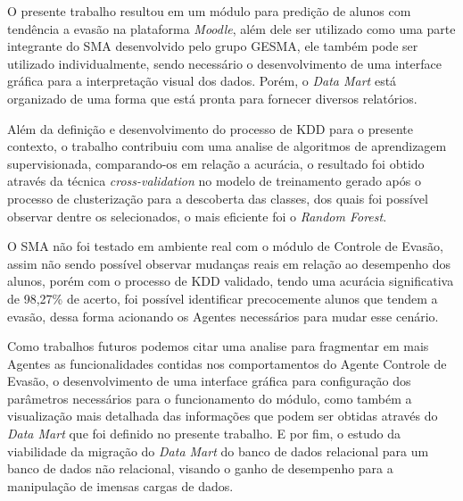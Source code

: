 O presente trabalho resultou em um módulo para predição de alunos com tendência a evasão na plataforma \textit{Moodle}, além dele ser utilizado como uma parte integrante do SMA desenvolvido pelo grupo GESMA, ele também pode ser utilizado individualmente, sendo necessário o desenvolvimento de uma interface gráfica para a interpretação visual dos dados. Porém, o \textit{Data Mart} está organizado de uma forma que está pronta para fornecer diversos relatórios.

Além da definição e desenvolvimento do processo de KDD para o presente contexto, o trabalho contribuiu com uma analise de algoritmos de aprendizagem supervisionada, comparando-os em relação a acurácia, o resultado foi obtido através da técnica \textit{cross-validation} no modelo de treinamento gerado após o processo de clusterização para a descoberta das classes, dos quais foi possível observar dentre os selecionados, o mais eficiente foi o \textit{Random Forest}.

O SMA não foi testado em ambiente real com o módulo de Controle de Evasão, assim não sendo possível observar mudanças reais em relação ao desempenho dos alunos, porém com o processo de KDD validado, tendo uma acurácia significativa de 98,27\% de acerto, foi possível identificar precocemente alunos que tendem a evasão, dessa forma acionando os Agentes necessários para mudar esse cenário. 

Como trabalhos futuros podemos citar uma analise para fragmentar em mais Agentes as funcionalidades contidas nos comportamentos do Agente Controle de Evasão, o desenvolvimento de uma interface gráfica para configuração dos parâmetros necessários para o funcionamento do módulo, como também a visualização mais detalhada das informações que podem ser obtidas através do \textit{Data Mart} que foi definido no presente trabalho. E por fim, o estudo da viabilidade da migração do \textit{Data Mart} do banco de dados relacional para um banco de dados não relacional, visando o ganho de desempenho para a manipulação de imensas cargas de dados.